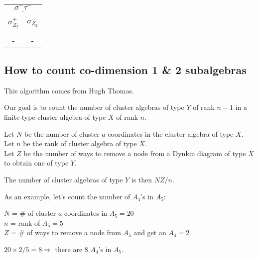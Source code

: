 \documentclass[12pt]{article}
\begin{document}
\begin{center}
\hspace{1.2cm}
\begin{tabular}{| c | c |}
\multicolumn{2}{c}{$\underline{\sigma^- \tau^-}$} \\[-1em]
\multicolumn{1}{c}{} & \multicolumn{1}{c}{} \\
\multicolumn{1}{c}{$\sigma_{Z_2}^+$} & \multicolumn{1}{c}{$\sigma_{Z_2}^-$} \\[-1em]
\multicolumn{1}{c}{} & \multicolumn{1}{c}{} \\
\hline
- & - \\
\hline
\end{tabular} 
\vspace{.6cm}



\end{center}

\pagebreak
\subsection*{How to count co-dimension 1 \& 2 subalgebras}

This algorithm comes from Hugh Thomas.

Our goal is to count the number of cluster algebras of type \(Y\) of rank \(n-1\) in a finite type cluster algebra of type \(X\) of rank \(n\).

Let \(N\) be the number of cluster \(a\)-coordinates in the cluster algebra of type \(X\).\\
Let \(n\) be the rank of cluster algebra of type \(X\).\\
Let \(Z\) be the number of ways to remove a node from a Dynkin diagram of type \(X\) to obtain one of type \(Y\).

The number of cluster algebras of type \(Y\) is then \(NZ/n\).

As an example, let's count the number of \(A_4\)'s in \(A_5\):

\(N\) = \# of cluster \(a\)-coordinates in \(A_5 = 20\)\\
\(n\) = rank of \(A_5 = 5\)\\
\(Z\) = \# of ways to remove a node from \(A_5\) and get an \(A_4 = 2\)

\(20\times2/5 = 8 \Rightarrow\) there are 8 \(A_4\)'s in \(A_5\).
\end{document}
